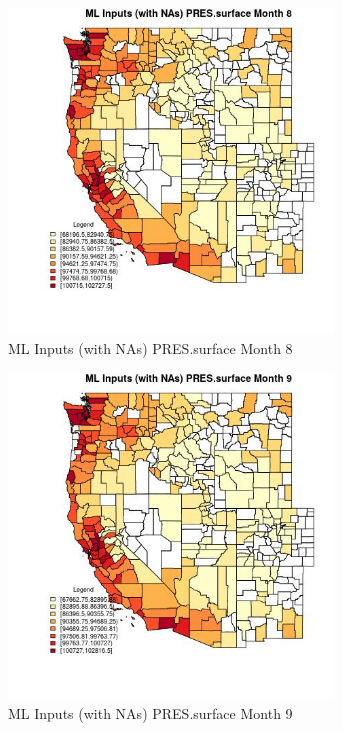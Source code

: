 \begin{figure} 
\centering  
\includegraphics[width=0.77\textwidth]{Code_Outputs/Report_ML_input_PM25_Step4_part_f_de_duplicated_aveswNAs_CountyPRESsurfacemedianMonth8.jpg} 
\caption{\label{fig:Report_ML_input_PM25_Step4_part_f_de_duplicated_aveswNAsCountyPRESsurfacemedianMonth8}ML Inputs (with NAs) PRES.surface Month 8} 
\end{figure} 
 

\begin{figure} 
\centering  
\includegraphics[width=0.77\textwidth]{Code_Outputs/Report_ML_input_PM25_Step4_part_f_de_duplicated_aveswNAs_CountyPRESsurfacemedianMonth9.jpg} 
\caption{\label{fig:Report_ML_input_PM25_Step4_part_f_de_duplicated_aveswNAsCountyPRESsurfacemedianMonth9}ML Inputs (with NAs) PRES.surface Month 9} 
\end{figure} 
 

